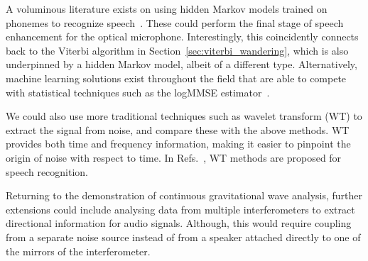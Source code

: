 \documentclass[paper-main.tex]{subfiles}
\begin{document}
A voluminous literature exists on using hidden Markov models trained on phonemes to recognize speech~\cite{HMM_english}. These could perform the final stage of speech enhancement for the optical microphone. Interestingly, this coincidently connects back to the Viterbi algorithm in Section~\ref{sec:viterbi_wandering}, which is also underpinned by a hidden Markov model, albeit of a different type. Alternatively, machine learning solutions exist throughout the field that are able to compete with statistical techniques such as the logMMSE estimator~\cite{SEGAN}.


We could also use more traditional techniques such as wavelet transform (WT) \citep{nason1995stationary} to extract the signal from noise, and compare these with the above methods. WT provides both time and frequency information, making it easier to pinpoint the origin of noise with respect to time. In Refs.~\cite{tufekci2000feature,agbinya1996discrete}, WT methods are proposed for speech recognition. 

Returning to the demonstration of continuous gravitational wave analysis, further extensions could include analysing data from multiple interferometers to extract directional information for audio signals. Although, this would require coupling from a separate noise source instead of from a speaker attached directly to one of the mirrors of the interferometer. 




\end{document}
